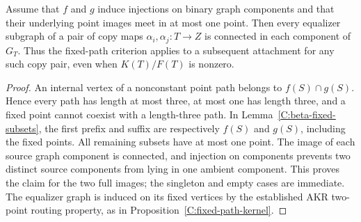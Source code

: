 \begin{corollary}
\label{C:beta-small-overlap}
Assume that $f$ and $g$ induce injections on binary graph components
and that their underlying point images meet in at most one point.
Then every equalizer subgraph of a pair of copy maps
$\alpha_i,\alpha_j:T\to Z$ is connected in each component of $G_T$.
Thus the fixed-path criterion applies to a subsequent attachment for
any such copy pair, even when $K(T)/F(T)$ is nonzero.
\end{corollary}
\begin{proof}
An internal vertex of a nonconstant point path belongs to
$f(S)\cap g(S)$. Hence every path has length at most three, at most
one has length three, and a fixed point cannot coexist with a
length-three path. In Lemma~\ref{C:beta-fixed-subsets}, the first
prefix and suffix are respectively $f(S)$ and $g(S)$, including the
fixed points. All remaining subsets have at most one point.
The image of each source graph component is connected, and injection
on components prevents two distinct source components from lying
in one ambient component. This proves the claim for the two full
images; the singleton and empty cases are immediate. The equalizer
graph is induced on its fixed vertices by the established AKR
two-point routing property, as in
Proposition~\ref{C:fixed-path-kernel}.
\end{proof}
